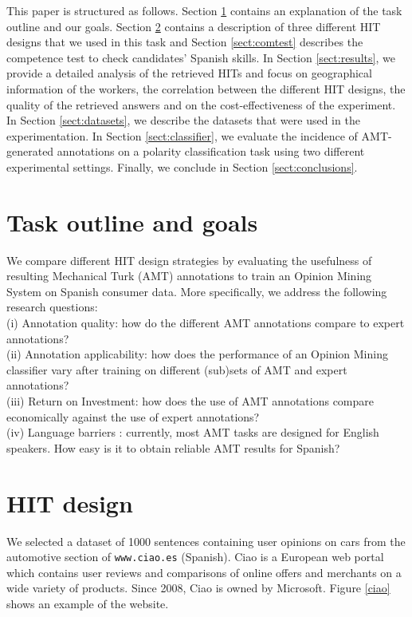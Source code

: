\documentclass[11pt]{elsarticle}
\begin{document}
This paper is structured as follows. Section \ref{sect:outline} contains an explanation of the task outline and our goals. Section \ref{sect:design} contains a description of three different HIT designs that we used in this task and Section \ref{sect:comtest} describes the competence test to check candidates' Spanish skills. In Section \ref{sect:results}, we provide a detailed analysis of the retrieved HITs and focus on geographical information of the workers, the correlation between the different HIT designs, the quality of the retrieved answers and on the cost-effectiveness of the experiment. In Section \ref{sect:datasets}, we describe the datasets that were used in the experimentation. In Section \ref{sect:classifier}, we evaluate the incidence of AMT-generated annotations on a polarity classification task using two different experimental settings. Finally, we conclude in Section \ref{sect:conclusions}.

\section{Task outline and goals}
\label{sect:outline}

We compare different HIT design strategies by evaluating the usefulness of resulting Mechanical Turk (AMT) annotations to train an Opinion Mining System on Spanish consumer data. More specifically, we address the following research questions:\\
 \indent (i) Annotation quality: how do the different AMT annotations compare to expert annotations?\\
 \indent (ii) Annotation applicability: how does the performance of an Opinion Mining classifier vary after training on different (sub)sets of AMT and expert annotations?\\
 \indent (iii) Return on Investment: how does the use of AMT annotations compare economically against the use of expert annotations?\\
 \indent (iv) Language barriers \cite{irvine-klementiev:2010:MTURK}: currently, most AMT tasks are designed for English speakers. How easy is it to obtain reliable AMT results for Spanish?

\section{HIT design}
\label{sect:design}

We selected a dataset of 1000 sentences containing user opinions on cars from the automotive section of \texttt{www.ciao.es} (Spanish). Ciao is a European web portal which contains user reviews and comparisons of online offers and merchants on a wide variety of products. Since 2008, Ciao is owned by Microsoft. Figure \ref{ciao} shows an example of the website.
\end{document}
